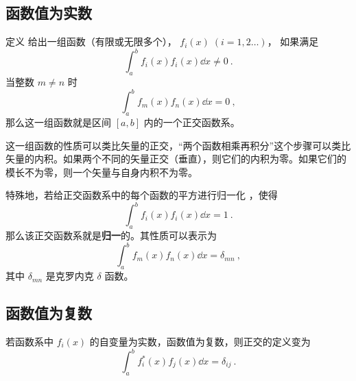 
\subsection{函数值为实数}

定义
给出一组函数（有限或无限多个）， $f_i(x)\; (i = 1,2\dots)$， 如果满足
\begin{equation}
\int_a^b f_i(x) f_i(x) \dd{x} \ne 0~.
\end{equation} 
当整数 $m \ne n$ 时
\begin{equation}
\int_a^b f_m(x) f_n(x) \dd{x} = 0~,
\end{equation} 
那么这一组函数就是区间 $[a,b]$ 内的一个正交函数系。

这一组函数的性质可以类比矢量的正交，“两个函数相乘再积分”这个步骤可以类比矢量的内积。如果两个不同的矢量正交（垂直），则它们的内积为零。如果它们的模长不为零，则一个矢量与自身内积不为零。

特殊地，若给正交函数系中的每个函数的平方进行归一化%
，使得
\begin{equation}
\int_a^b f_i(x) f_i(x) \dd{x} = 1~.
\end{equation} 
那么该正交函数系就是\textbf{归一}的。其性质可以表示为
 \begin{equation}
\int_a^b f_m(x) f_n(x) \dd{x} = \delta_{mn}~,
\end{equation} 
其中 $\delta_{mn}$ 是克罗内克 $\delta$ 函数。


\subsection{函数值为复数}

若函数系中 $f_i(x)$ 的自变量为实数，函数值为复数，则正交的定义变为
 \begin{equation}
\int_a^b f_i^*(x) f_j(x) \dd{x} = \delta_{ij}~.
\end{equation}
